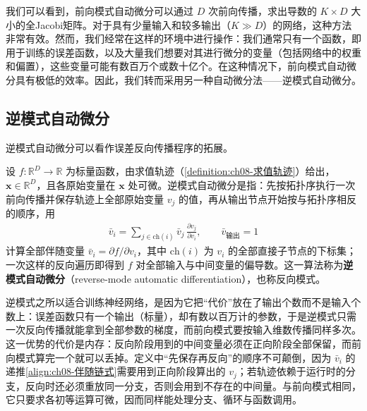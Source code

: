\documentclass[../../main.tex]{subfiles}
\begin{document}
我们可以看到，前向模式自动微分可以通过 $D$ 次前向传播，求出导数的 $K\times D$ 大小的全Jacobi矩阵。对于具有少量输入和较多输出（$K\gg D$）的网络，这种方法非常有效。然而，我们经常在这样的环境中进行操作：我们通常只有一个函数，即用于训练的误差函数，以及大量我们想要对其进行微分的变量（包括网络中的权重和偏置），这些变量可能有数百万个或数十亿个。在这种情况下，前向模式自动微分具有极低的效率。因此，我们转而采用另一种自动微分法——逆模式自动微分。

\subsection{逆模式自动微分}\label{subsection:ch08-逆模式}

逆模式自动微分可以看作误差反向传播程序的拓展。

\begin{definition}[逆模式自动微分]\label{definition:ch08-逆模式}
设 $f:\mathbb{R}^{D}\to\mathbb{R}$ 为标量函数，由求值轨迹（\cref{definition:ch08-求值轨迹}）给出，$\mathbf{x}\in\mathbb{R}^{D}$，且各原始变量在 $\mathbf{x}$ 处可微。逆模式自动微分是指：先按拓扑序执行一次前向传播并保存轨迹上全部原始变量 $v_j$ 的值，再从输出节点开始按与拓扑序相反的顺序，用
\begin{align*}
\bar{v}_i=\sum_{j\in\mathrm{ch}(i)}\bar{v}_j\,\frac{\partial v_j}{\partial v_i},\qquad \bar{v}_{\text{输出}}=1
\end{align*}
计算全部伴随变量 $\bar{v}_i=\partial f/\partial v_i$，其中 $\mathrm{ch}(i)$ 为 $v_i$ 的全部直接子节点的下标集；一次这样的反向遍历即得到 $f$ 对全部输入与中间变量的偏导数。这一算法称为\textbf{逆模式自动微分}（reverse-mode automatic differentiation），也称反向模式。
\end{definition}

\begin{remark}
逆模式之所以适合训练神经网络，是因为它把“代价”放在了输出个数而不是输入个数上：误差函数只有一个输出（标量），却有数以百万计的参数，于是逆模式只需一次反向传播就能拿到全部参数的梯度，而前向模式要按输入维数传播同样多次。这一优势的代价是内存：反向阶段用到的中间变量必须在正向阶段全部保留，而前向模式算完一个就可以丢掉。定义中“先保存再反向”的顺序不可颠倒，因为 $\bar{v}_i$ 的递推\eqref{align:ch08-伴随链式}需要用到正向阶段算出的 $v_j$；若轨迹依赖于运行时的分支，反向时还必须重放同一分支，否则会用到不存在的中间量。与前向模式相同，它只要求各初等运算可微，因而同样能处理分支、循环与函数调用。
\end{remark}
\end{document}
